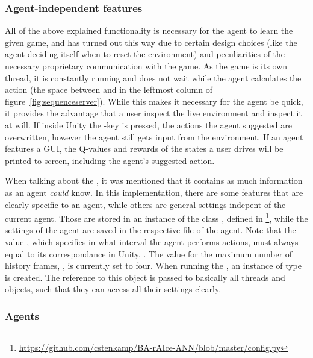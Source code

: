\subsubsection{Agent-independent features}

All of the above explained functionality is necessary for the agent to learn the given game, and has turned out this way due to certain design choices (like the agent deciding itself when to reset the environment) and peculiarities of the necessary proprietary communication with the game. As the game is its own thread, it is constantly running and does not wait while the agent calculates the action (the space between  and  in the leftmost column of figure~\ref{fig:sequenceserver}). While this makes it necessary for the agent be quick, it provides the advantage that a user inspect the live environment and inspect it at will. If inside Unity the -key is pressed, the actions the agent suggested are overwritten, however the agent still gets input from the environment. If an agent features a GUI, the Q-values and rewards of the states a user drives will be printed to screen, including the agent's suggested action.

When talking about the , it was mentioned that it contains as much information as an agent \textit{could} know. In this implementation, there are some features that are clearly specific to an agent, while others are general settings indepent of the current agent. Those are stored in an instance of the class , defined in \footnote{\url{https://github.com/cstenkamp/BA-rAIce-ANN/blob/master/config.py}}, while the settings of the agent are saved in the respective file of the agent. Note that the value , which specifies in what interval the agent performs actions, must always equal to its correspondance in Unity, . The value for the maximum number of history frames, , is currently set to four. When running the , an instance  of type  is created. The reference to this object is passed to basically all threads and objects, such that they can access all their settings clearly.


\subsubsection{Agents}

